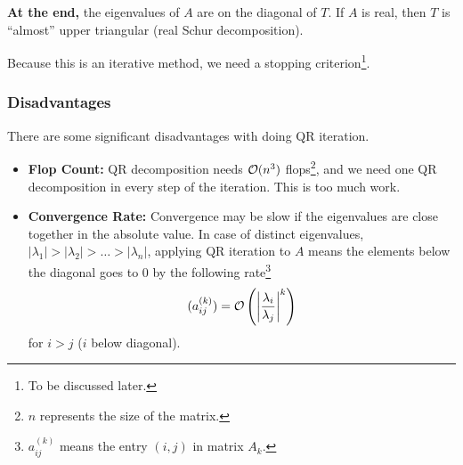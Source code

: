 \documentclass[letterpaper]{article}
\newcommand{\0}{\mathbf{0}}
\begin{document}
\bigskip 

\textbf{At the end,} the eigenvalues of $A$ are on the diagonal of $T$. If $A$ is real, then $T$ is ``almost'' upper triangular (real Schur decomposition). 

\bigskip 

Because this is an iterative method, we need a stopping criterion\footnote{To be discussed later.}.

\subsubsection{Disadvantages}
There are some significant disadvantages with doing QR iteration. 
\begin{itemize}
    \item \textbf{Flop Count:} QR decomposition needs $\mathcal{O}(n^3)$ flops\footnote{$n$ represents the size of the matrix.}, and we need one QR decomposition in every step of the iteration. This is too much work. 
    \item \textbf{Convergence Rate:} Convergence may be slow if the eigenvalues are close together in the absolute value. In case of distinct eigenvalues, $|\lambda_1| > |\lambda_2| > \hdots > |\lambda_n|$, applying QR iteration to $A$ means the elements below the diagonal goes to 0 by the following rate\footnote{$a_{ij}^{(k)}$ means the entry $(i, j)$ in matrix $A_k$.}
    \[(a_{ij}^{(k)}) = \mathcal{O}\left(\left|\frac{\lambda_i}{\lambda_j}\right|^k\right)\] for $i > j$ ($i$ below diagonal). 
\end{itemize}
\end{document}
